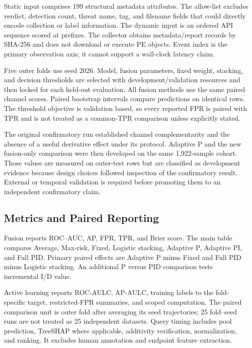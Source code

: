Static input comprises 199 structural metadata attributes. The allow-list
excludes verdict, detection count, threat name, tag, and filename fields that
could directly encode collection or label information. The dynamic input is an
ordered API sequence scored at prefixes. The collector obtains metadata/report
records by SHA-256 and does not download or execute PE objects. Event index is
the primary observation axis; it cannot support a wall-clock latency claim.

Five outer folds use seed 2026. Model, fusion parameters, fixed weight, stacking,
and decision thresholds are selected with development/validation resources and
then locked for each held-out evaluation. All fusion methods use the same paired
channel scores. Paired bootstrap intervals compare predictions on identical
rows. The threshold objective is validation based, so every reported FPR is
paired with TPR and is not treated as a common-TPR comparison unless explicitly
stated.

The original confirmatory run established channel complementarity and the
absence of a useful derivative effect under its protocol. Adaptive P and the
new fusion-only comparison were then developed on the same 1,922-sample cohort.
Those values are measured on outer-test rows but are classified as development
evidence because design choices followed inspection of the confirmatory result.
External or temporal validation is required before promoting them to an
independent confirmatory claim.

\subsection{Metrics and Paired Reporting}

Fusion reports ROC--AUC, AP, FPR, TPR, and Brier score. The main table compares
Average, Max-risk, Fixed, Logistic stacking, Adaptive P, Adaptive PI, and Full
PID. Primary paired effects are Adaptive P minus Fixed and Full PID minus
Logistic stacking. An additional P versus PID comparison tests incremental I/D
value.

Active learning reports ROC-AULC, AP-AULC, training labels to the fold-specific
target, restricted-FPR summaries, and scoped computation. The paired comparison
unit is outer fold after averaging its seed trajectories; 25 fold--seed runs are
not treated as 25 independent datasets. Query timing includes pool prediction,
TreeSHAP where applicable, additivity verification, normalization, and ranking.
It excludes human annotation and endpoint feature extraction.

